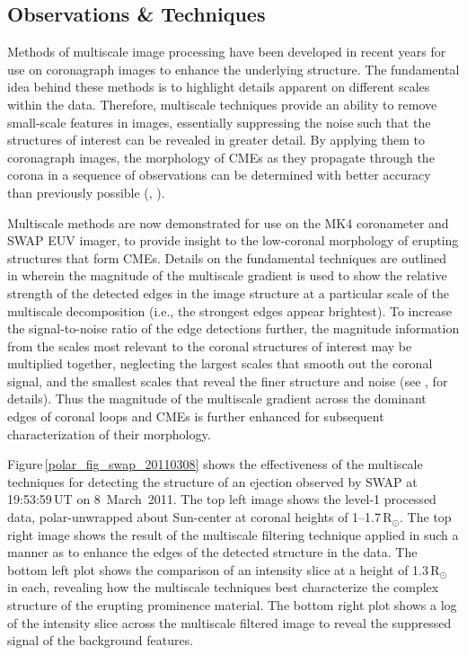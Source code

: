 \documentclass[namedreferences]{solarphysics}
\begin{document}
\begin{article}
\section{Observations \& Techniques}
\label{sect:techniques}


Methods of multiscale image processing have been developed in recent years for use on coronagraph images to enhance the underlying structure. The fundamental idea behind these methods is to highlight details apparent on different scales within the data. Therefore, multiscale techniques provide an ability to remove small-scale features in images, essentially suppressing the noise such that the structures of interest can be revealed in greater detail. By applying them to coronagraph images, the morphology of CMEs as they propagate through the corona in a sequence of observations can be determined with better accuracy than previously possible (, \citeyear{2012ApJ...752..145B}). %

Multiscale methods are now demonstrated for use on the MK4 coronameter and SWAP EUV imager, to provide insight to the low-coronal morphology of erupting structures that form CMEs. Details on the fundamental techniques are outlined in  wherein the magnitude of the multiscale gradient is used to show the relative strength of the detected edges in the image structure at a particular scale of the multiscale decomposition (i.e., the strongest edges appear brightest). To increase the signal-to-noise ratio of the edge detections further, the magnitude information from the scales most relevant to the coronal structures of interest may be multiplied together, neglecting the largest scales that smooth out the coronal signal, and the smallest scales that reveal the finer structure and noise (see , for details). Thus the magnitude of the multiscale gradient across the dominant edges of coronal loops and CMEs is further enhanced for subsequent characterization of their morphology. 

Figure\,\ref{polar_fig_swap_20110308} shows the effectiveness of the multiscale techniques for detecting the structure of an ejection observed by SWAP at 19:53:59\,UT on 8~March~2011. The top left image shows the level-1 processed data, polar-unwrapped about Sun-center at coronal heights of 1--1.7\,R$_{\odot}$. The top right image shows the result of the multiscale filtering technique applied in such a manner as to enhance the edges of the detected structure in the data. The bottom left plot shows the comparison of an intensity slice at a height of 1.3\,R$_{\odot}$ in each, revealing how the multiscale techniques best characterize the complex structure of the erupting prominence material. The bottom right plot shows a log of the intensity slice across the multiscale filtered image to reveal the suppressed signal of the background features.


\end{article}
\end{document}
